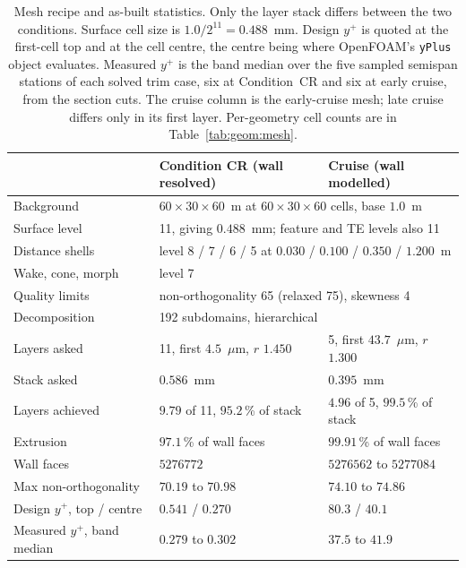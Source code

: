 \begin{table}[htbp]
  \centering
  \scriptsize
  \caption{Mesh recipe and as-built statistics. Only the layer stack differs between the two
  conditions. Surface cell size is $1.0/2^{11} = \num{0.488}$~mm. Design $y^+$ is quoted at the
  first-cell top and at the cell centre, the centre being where OpenFOAM's \texttt{yPlus} object
  evaluates. Measured $y^+$ is the band median over the five sampled semispan stations of each
  solved trim case, six at Condition~CR and six at early cruise, from the section cuts. The cruise
  column is the early-cruise mesh; late cruise differs only in its first layer.
  Per-geometry cell counts are in Table~\ref{tab:geom:mesh}.}
  \label{tab:setup:mesh}
  \begin{tabular}{lll}
    \toprule
     & Condition CR (wall resolved) & Cruise (wall modelled) \\
    \midrule
    Background        & \multicolumn{2}{l}{$60\times30\times60$~m at $60\times30\times60$ cells, base $1.0$~m} \\
    Surface level     & \multicolumn{2}{l}{11, giving $\num{0.488}$~mm; feature and TE levels also 11} \\
    Distance shells   & \multicolumn{2}{l}{level 8 / 7 / 6 / 5 at $0.030$ / $0.100$ / $0.350$ / $1.200$~m} \\
    Wake, cone, morph & \multicolumn{2}{l}{level 7} \\
    Quality limits    & \multicolumn{2}{l}{non-orthogonality 65 (relaxed 75), skewness 4} \\
    Decomposition     & \multicolumn{2}{l}{192 subdomains, hierarchical} \\
    \midrule
    Layers asked      & 11, first $4.5$~$\mu$m, $r$ $1.450$ & 5, first $43.7$~$\mu$m, $r$ $1.300$ \\
    Stack asked       & $0.586$~mm & $0.395$~mm \\
    Layers achieved   & $9.79$ of 11, $95.2$\,\% of stack & $4.96$ of 5, $99.5$\,\% of stack \\
    Extrusion         & $97.1$\,\% of wall faces & $99.91$\,\% of wall faces \\
    Wall faces        & $\num{5276772}$ & $\num{5276562}$ to $\num{5277084}$ \\
    Max non-orthogonality & $70.19$ to $70.98$ & $74.10$ to $74.86$ \\
    \midrule
    Design $y^+$, top / centre  & $0.541$ / $0.270$ & $80.3$ / $40.1$ \\
    Measured $y^+$, band median & $0.279$ to $0.302$ & $37.5$ to $41.9$ \\
    \bottomrule
  \end{tabular}
\end{table}

